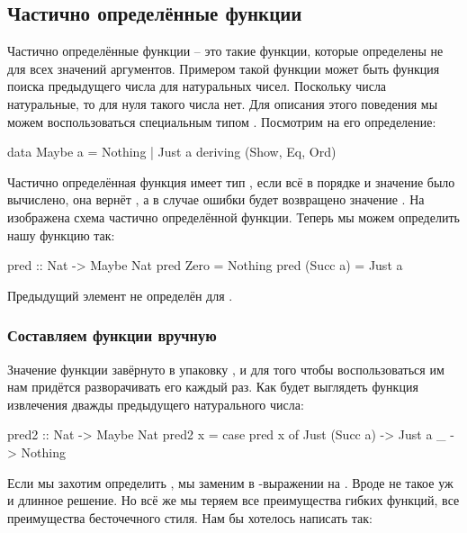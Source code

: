 \subsection{Частично определённые функции}

Частично определённые функции -- это такие функции, которые
определены не для всех значений аргументов. Примером такой
функции может быть функция поиска предыдущего числа для
натуральных чисел. Поскольку числа натуральные, то для
нуля такого числа нет. 
Для описания этого поведения мы можем воспользоваться 
специальным типом 
. Посмотрим на его определение:

\begin{code}
data Maybe a = Nothing | Just a
    deriving (Show, Eq, Ord)
\end{code}


Частично определённая функция имеет тип , 
если всё в порядке и значение было вычислено, она вернёт 
, а в случае ошибки будет возвращено значение
. На  изображена схема частично 
определённой функции. Теперь мы можем определить нашу функцию так:

\begin{code}
pred :: Nat -> Maybe Nat
pred Zero       = Nothing
pred (Succ a)   = Just a
\end{code}

Предыдущий элемент не определён для . 

\subsubsection{Составляем функции вручную}

Значение функции  завёрнуто в упаковку , и для того чтобы
воспользоваться им нам придётся разворачивать его каждый раз.
Как будет выглядеть функция извлечения дважды предыдущего 
натурального числа:

\begin{code}
pred2 :: Nat -> Maybe Nat
pred2 x = 
    case pred x of
        Just (Succ a) -> Just a
        _             -> Nothing
\end{code}

Если мы захотим определить , мы заменим  
в -выражении на . Вроде не такое уж и длинное решение.
Но всё же мы теряем все преимущества гибких функций, все преимущества
бесточечного стиля. Нам бы хотелось написать так:

